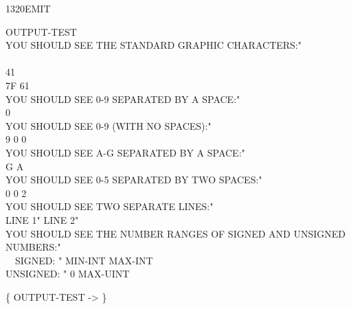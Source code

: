 \begin{worddef}{1320}{EMIT}
\begin{defer}
		\word{:} OUTPUT-TEST \\[1ex]
		\tab   {} YOU SHOULD SEE THE STANDARD GRAPHIC CHARACTERS:"  \\
		       \\
		 41      \\
		\tab   7F 61      \\[1ex]
		\tab   {} YOU SHOULD SEE 0-9 SEPARATED BY A SPACE:"  \\
		  0      \\[1ex]
		\tab   {} YOU SHOULD SEE 0-9 (WITH NO SPACES):"  \\
		\tab   \word{[CHAR]} 9  \word{[CHAR]} 0
			  0     \\[1ex]
		\tab   {} YOU SHOULD SEE A-G SEPARATED BY A SPACE:"  \\
		\tab   \word{[CHAR]} G  \word{[CHAR]} A
			      \\[1ex]
		\tab   {} YOU SHOULD SEE 0-5 SEPARATED BY TWO SPACES:"  \\
		  0
			  \word{[CHAR]} 0 \word{+}  2    \\[1ex]
		\tab   {} YOU SHOULD SEE TWO SEPARATE LINES:"  \\
		\tab   {} LINE 1"    LINE 2"   \\[1ex]
		\tab   {} {\small YOU SHOULD SEE THE NUMBER RANGES OF SIGNED AND UNSIGNED NUMBERS:}"  \\
		\tab   {} ~~SIGNED: " MIN-INT  MAX-INT   \\
		\tab   {} UNSIGNED: " 0  MAX-UINT   \\
		\word{;}

		\{ OUTPUT-TEST -> \}
	\end{defer}
\end{worddef}


